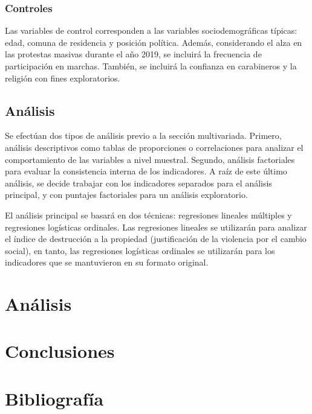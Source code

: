 \documentclass[12pt,twoside]{templates/facsothesis}
\begin{document}
\hypertarget{controles}{%
\subsection{Controles}\label{controles}}

Las variables de control corresponden a las variables sociodemográficas típicas: edad, comuna de residencia y posición política. Además, considerando el alza en las protestas masivas durante el año 2019, se incluirá la frecuencia de participación en marchas. También, se incluirá la confianza en carabineros y la religión con fines exploratorios.

\hypertarget{anuxe1lisis}{%
\section{Análisis}\label{anuxe1lisis}}

Se efectúan dos tipos de análisis previo a la sección multivariada. Primero, análisis descriptivos como tablas de proporciones o correlaciones para analizar el comportamiento de las variables a nivel muestral. Segundo, análisis factoriales para evaluar la consistencia interna de los indicadores. A raíz de este último análisis, se decide trabajar con los indicadores separados para el análisis principal, y con puntajes factoriales para un análisis exploratorio.

El análisis principal se basará en dos técnicas: regresiones lineales múltiples y regresiones logísticas ordinales. Las regresiones lineales se utilizarán para analizar el índice de destrucción a la propiedad (justificación de la violencia por el cambio social), en tanto, las regresiones logísticas ordinales se utilizarán para los indicadores que se mantuvieron en su formato original.

\pagebreak

\hypertarget{anuxe1lisis-1}{%
\chapter{Análisis}\label{anuxe1lisis-1}}

\hypertarget{conclusiones}{%
\chapter{Conclusiones}\label{conclusiones}}

\hypertarget{bibliografuxeda}{%
\chapter*{Bibliografía}\label{bibliografuxeda}}
\end{document}
